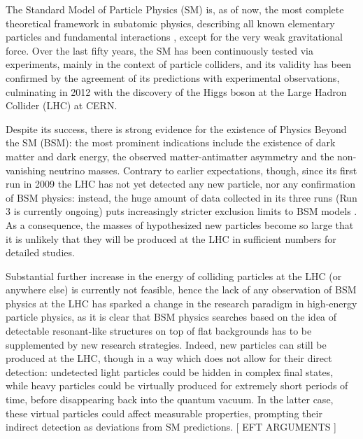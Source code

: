 
The Standard Model of Particle Physics (SM) is, as of now, the most complete theoretical framework in subatomic physics, describing all known elementary particles and fundamental interactions \cite{Glashow-1961, Salam-1964, Weinberg-1967, Fritzsch-1972, Fritzsch-1973, Higgs-1964-1, Higgs-1964-2, Englert-1964, Guralnik-1964}, except for the very weak gravitational force. Over the last fifty years, the SM has been continuously tested via experiments, mainly in the context of particle colliders, and its validity has been confirmed by the agreement of its predictions with experimental observations, culminating in 2012 with the discovery of the Higgs boson \cite{ATLAS-2012, CMS-2012} at the Large Hadron Collider (LHC) at CERN.

Despite its success, there is strong evidence for the existence of Physics Beyond the SM (BSM): the most prominent indications include the existence of dark matter and dark energy, the observed matter-antimatter asymmetry and the non-vanishing neutrino masses. Contrary to earlier expectations, though, since its first run in 2009 the LHC has not yet detected any new particle, nor any confirmation of BSM physics: instead, the huge amount of data collected in its three runs (Run 3 is currently ongoing) puts increasingly stricter exclusion limits to BSM models \cite{CMS-ATLAS-SUSY, Bsekidt-2012, Ghosh-2025, Crivellin-2015}. As a consequence, the masses of hypothesized new particles become so large that it is unlikely that they will be produced at the LHC in sufficient numbers for detailed studies.

Substantial further increase in the energy of colliding particles at the LHC (or anywhere else) is currently not feasible, hence the lack of any observation of BSM physics at the LHC has sparked a change in the research paradigm in high-energy particle physics, as it is clear that BSM physics searches based on the idea of detectable resonant-like structures on top of flat backgrounds has to be supplemented by new research strategies. Indeed, new particles can still be produced at the LHC, though in a way which does not allow for their direct detection: undetected light particles could be hidden in complex final states, while heavy particles could be virtually produced for extremely short periods of time, before disappearing back into the quantum vacuum. In the latter case, these virtual particles could affect measurable properties, prompting their indirect detection as deviations from SM predictions.
%
[ EFT ARGUMENTS ]

